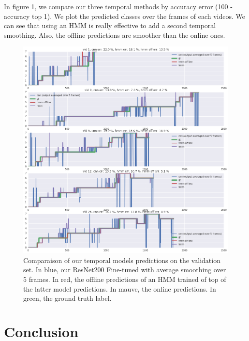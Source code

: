 \documentclass[10pt,twocolumn,letterpaper]{article}
\begin{document}
In figure 1, we compare our three temporal methods by accuracy error (100 - accuracy top 1). We plot the predicted classes over the frames of each videos. We can see that using an HMM is really effective to add a second temporal smoothing. Also, the offline predictions are smoother than the online ones.

\begin{figure}
\begin{center}
   \includegraphics[width=1\linewidth]{images/visu.png}
\end{center}
   \caption{Comparaison of our temporal models predictions on the validation set. In blue, our ResNet200 Fine-tuned with average smoothing over 5 frames. In red, the offline predictions of an HMM trained of top of the latter model predictions. In mauve, the online predictions. In green, the ground truth label. }
\label{fig:long}
\label{fig:onecol}
\end{figure}



\section{Conclusion}
\end{document}
